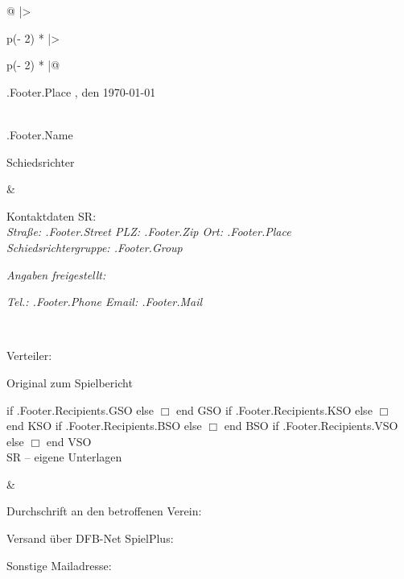 \documentclass[a4paper, 11pt]{article}
\begin{document}
    \begin{longtable}[]{@{}
        |>{\raggedright\arraybackslash}p{(\columnwidth - 2\tabcolsep) * }
        |>{\raggedright\arraybackslash}p{(\columnwidth - 2\tabcolsep) * }|@{}}
        \hline
        \endhead
        \begin{minipage}[t]{\linewidth}
            \raggedright
            {{ .Footer.Place }}, den \today \\
            \strut \\
            {{ .Footer.Name }}

            Schiedsrichter\strut
        \end{minipage} & \begin{minipage}[t]{\linewidth}
                             \raggedright
                             Kontaktdaten SR:\\
                             \emph{Straße: {{ .Footer.Street }} PLZ: {{ .Footer.Zip }} Ort: {{ .Footer.Place }}\\
                             Schiedsrichtergruppe: {{ .Footer.Group }}}

                             \emph{Angaben freigestellt:}

                             \emph{Tel.: {{ .Footer.Phone }} Email: {{ .Footer.Mail }}}\strut
        \end{minipage} \\
        \hline
        \begin{minipage}[t]{\linewidth}
            \raggedright
            Verteiler:

            \checkmark{} Original zum Spielbericht

                {{ if .Footer.Recipients.GSO }} \checkmark{} {{ else }} $\Box$ {{ end }} GSO
                {{ if .Footer.Recipients.KSO }} \checkmark{} {{ else }} $\Box$ {{ end }} KSO
                {{ if .Footer.Recipients.BSO }} \checkmark{} {{ else }} $\Box$ {{ end }} BSO
                {{ if .Footer.Recipients.VSO }} \checkmark{} {{ else }} $\Box$ {{ end }} VSO\\
            \checkmark{} SR -- eigene Unterlagen\strut
        \end{minipage} & \begin{minipage}[t]{\linewidth}
                             \raggedright
                             Durchschrift an den betroffenen Verein:

                             Versand über DFB-Net SpielPlus:

                             Sonstige Mailadresse:\\
                             \emph{ }\strut
        \end{minipage} \\
        \hline
    \end{longtable}
\end{document}
